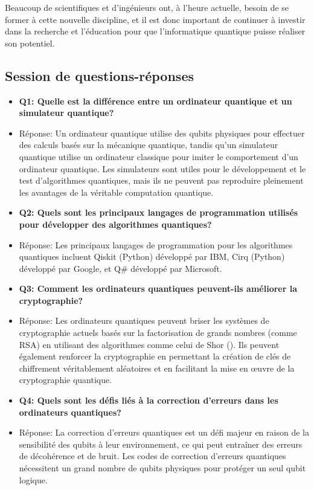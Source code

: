 \documentclass{article}
\begin{document}
Beaucoup de scientifiques et d'ingénieurs ont, à l'heure actuelle, besoin de se former à cette nouvelle discipline, et il est donc important de continuer à investir dans la recherche et l'éducation pour que l'informatique quantique puisse réaliser son potentiel.

\subsection{Session de questions-réponses}

\begin{itemize}
  \item \textbf{Q1: Quelle est la différence entre un ordinateur quantique et un simulateur quantique?}
  \item Réponse: Un ordinateur quantique utilise des qubits physiques pour effectuer des calculs basés sur la mécanique quantique, tandis qu'un simulateur quantique utilise un ordinateur classique pour imiter le comportement d'un ordinateur quantique. Les simulateurs sont utiles pour le développement et le test d'algorithmes quantiques, mais ils ne peuvent pas reproduire pleinement les avantages de la véritable computation quantique.
\\
  \item \textbf{Q2: Quels sont les principaux langages de programmation utilisés pour développer des algorithmes quantiques?}
  \item Réponse: Les principaux langages de programmation pour les algorithmes quantiques incluent Qiskit (Python) développé par IBM, Cirq (Python) développé par Google, et Q\# développé par Microsoft.
\\
  \item \textbf{Q3: Comment les ordinateurs quantiques peuvent-ils améliorer la cryptographie?}
  \item Réponse: Les ordinateurs quantiques peuvent briser les systèmes de cryptographie actuels basés sur la factorisation de grands nombres (comme RSA) en utilisant des algorithmes comme celui de Shor (\cite{wikipediaAlgorithmeShor}). Ils peuvent également renforcer la cryptographie en permettant la création de clés de chiffrement véritablement aléatoires et en facilitant la mise en œuvre de la cryptographie quantique.
\\
  \item \textbf{Q4: Quels sont les défis liés à la correction d'erreurs dans les ordinateurs quantiques?}
  \item Réponse: La correction d'erreurs quantiques est un défi majeur en raison de la sensibilité des qubits à leur environnement, ce qui peut entraîner des erreurs de décohérence et de bruit. Les codes de correction d'erreurs quantiques nécessitent un grand nombre de qubits physiques pour protéger un seul qubit logique.

\end{itemize}
\end{document}
